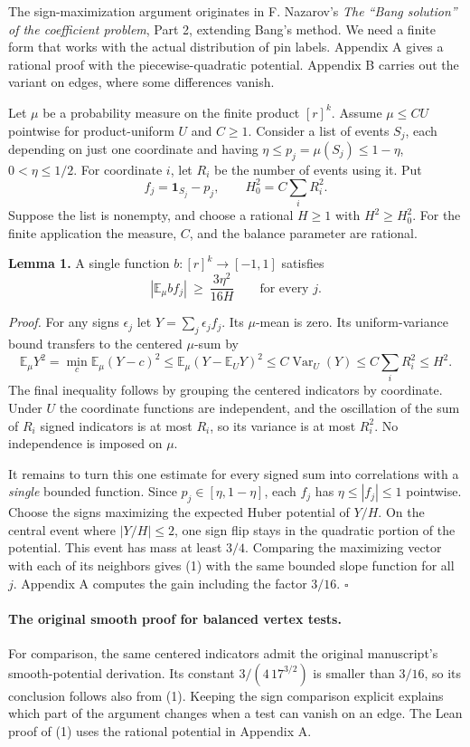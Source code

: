 \documentclass[
  11pt,
]{article}
\begin{document}
The sign-maximization argument originates in F. Nazarov's
\emph{The ``Bang solution'' of the coefficient problem}, Part 2, extending
Bang's method. We need a finite form that works with the actual
distribution of pin labels. Appendix A gives a rational proof with the
piecewise-quadratic potential. Appendix B carries out the variant on
edges, where some differences vanish.

Let \(\mu\) be a probability measure on the finite product \([r]^k\).
Assume \(\mu\le C U\) pointwise for product-uniform \(U\) and \(C\ge1\).
Consider a list of events \(S_j\), each depending on just one coordinate
and having \(\eta\le p_j=\mu(S_j)\le1-\eta\), \(0<\eta\le1/2\). For
coordinate \(i\), let \(R_i\) be the number of events using it. Put \[
         f_j=\mathbf1_{S_j}-p_j,\qquad H_0^2=C\sum_i R_i^2.
\] Suppose the list is nonempty, and choose a rational \(H\ge1\) with \(H^2\ge H_0^2\). For the finite application the measure, \(C\), and the balance parameter are rational.

\textbf{Lemma 1.} A single function \(b:[r]^k\to[-1,1]\) satisfies \[
             |\mathbb E_\mu b f_j|\ \ge\
                 \frac{3\eta^2}{16H}
                       \qquad\text{for every }j .
 \tag{1}
\]

\emph{Proof.} For any signs \(\epsilon_j\) let
\(Y=\sum_j\epsilon_j f_j\). Its \(\mu\)-mean is zero. Its
uniform-variance bound transfers to the centered \(\mu\)-sum by \[
 \mathbb E_\mu Y^2
   =\min_c\mathbb E_\mu(Y-c)^2
   \le \mathbb E_\mu(Y-\mathbb E_UY)^2
   \le C\operatorname{Var}_U(Y)
   \le C\sum_i R_i^2\le H^2 .
\] The final inequality follows by grouping the centered indicators by
coordinate. Under \(U\) the coordinate functions are independent, and
the oscillation of the sum of \(R_i\) signed indicators is at most
\(R_i\), so its variance is at most \(R_i^2\). No independence is
imposed on \(\mu\).

It remains to turn this one estimate for every signed sum into correlations
with a \emph{single} bounded function. Since \(p_j\in[\eta,1-\eta]\), each
\(f_j\) has \(\eta\le |f_j|\le1\) pointwise. Choose the signs maximizing
the expected Huber potential of \(Y/H\). On the central event where
\(|Y/H|\le2\), one sign flip stays in the quadratic portion of the potential.
This event has mass at least \(3/4\). Comparing the maximizing vector with
each of its neighbors gives (1) with the same bounded slope function for all
\(j\). Appendix A computes the gain including the factor \(3/16\).
\(\square\)

\paragraph{The original smooth proof for balanced vertex tests.}
For comparison, the same centered indicators admit the original manuscript's
smooth-potential derivation. Its constant
\(3/(4\,17^{3/2})\) is smaller than \(3/16\), so its conclusion follows
also from (1). Keeping the sign comparison explicit explains which part
of the argument changes when a test can vanish on an edge. The Lean
proof of (1) uses the rational potential in Appendix A.
\end{document}
